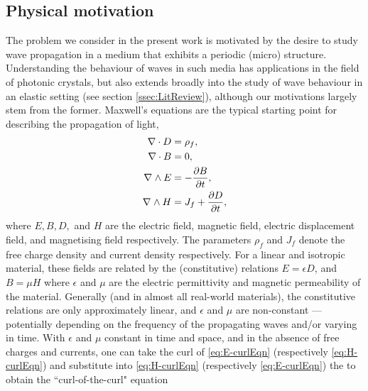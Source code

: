 \subsection{Physical motivation} \label{ssec:PhysMot}
The problem we consider in the present work is motivated by the desire to study wave propagation in a medium that exhibits a periodic (micro) structure.
Understanding the behaviour of waves in such media has applications in the field of photonic crystals, but also extends broadly into the study of wave behaviour in an elastic setting (see section \ref{ssec:LitReview}), although our motivations largely stem from the former.
Maxwell's equations are the typical starting point for describing the propagation of light,
\begin{subequations} \label{eq:MaxwellSystem}
	\begin{align} 
		\nabla \cdot D &= \rho_{f}, \label{eq:D-div} \\
		\nabla \cdot B &= 0, \label{eq:B-div} \\
		\nabla_{}\wedge E &= -\dfrac{\partial B}{\partial t}, \label{eq:E-curlEqn}\\
		\nabla_{}\wedge H &= J_{f} + \dfrac{\partial D}{\partial t}, \label{eq:H-curlEqn}
	\end{align}
\end{subequations}
where $E, B, D,$ and $H$ are the electric field, magnetic field, electric displacement field, and magnetising field respectively.
The parameters $\rho_{f}$ and $J_f$ denote the free charge density and current density respectively.
For a linear and isotropic material, these fields are related by the (constitutive) relations $E=\epsilon D$, and $B= \mu H$ where $\epsilon$ and $\mu$ are the electric permittivity and magnetic permeability of the material.
Generally (and in almost all real-world materials), the constitutive relations are only approximately linear, and $\epsilon$ and $\mu$ are non-constant --- potentially depending on the frequency of the propagating waves  and/or varying in time.
With $\epsilon$ and $\mu$ constant in time and space, and in the absence of free charges and currents, one can take the curl of \eqref{eq:E-curlEqn} (respectively \eqref{eq:H-curlEqn}) and substitute into \eqref{eq:H-curlEqn} (respectively \eqref{eq:E-curlEqn}) the to obtain the ``curl-of-the-curl" equation
